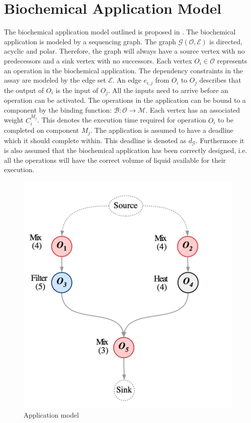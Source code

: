 \section{Biochemical Application Model}
\label{sec:app-model}
The biochemical application model outlined is proposed in \cite{wajid}. The biochemical application is modeled by a sequencing graph. The graph $\mathcal{G}(\mathcal{O}, \mathcal{E})$ is directed, acyclic and polar. Therefore, the graph will always have a source vertex with no predecessors and a sink vertex with no successors. Each vertex $O_i \in \mathcal{O}$ represents an operation in the biochemical application. The dependency constraints in the assay are modeled by the edge set $\mathcal{E}$. An edge $e_{i, j}$ from $O_i$ to $O_j$ describes that the output of $O_i$ is the input of $O_j$. All the inputs need to arrive before an operation can be activated. The operations in the application can be bound to a component by the binding function: $\mathcal{B} : \mathcal{O}  \rightarrow \mathcal{M}$. Each vertex has an associated weight $C^{M_j}_i$. This denotes the execution time required for operation $O_i$ to be completed on component $M_j$. The application is assumed to have a deadline which it should complete within. This deadline is denoted as $d_\mathcal{G}$. Furthermore it is also assumed that the biochemical application has been correctly designed, i.e. all the operations will have the correct volume of liquid available for their execution.

\begin{figure}
\centering
\includegraphics[scale=0.4]{figures/application-model.png}
\caption[Application model]{Application model}
\label{fig:application}
\end{figure}

